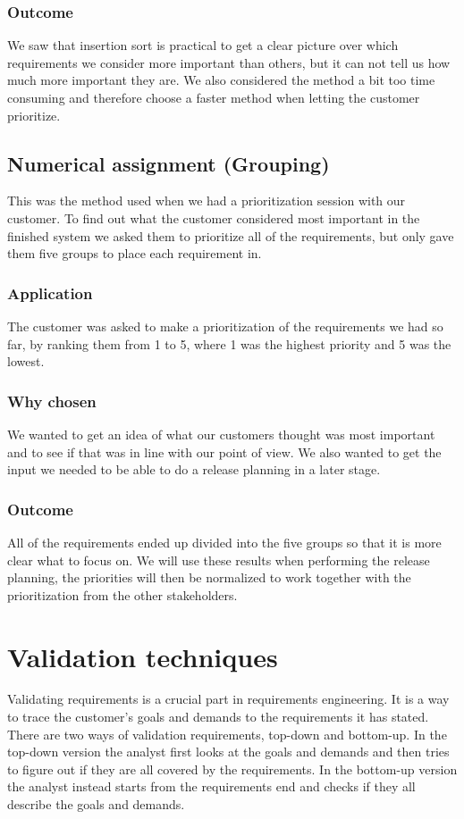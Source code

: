 \documentclass[a4paper]{article}
\begin{document}
		\subsubsection{Outcome}
			We saw that insertion sort is practical to get a clear picture over which requirements we consider more important than others, but it can not tell us how much more important they are. We also considered the method a bit too time consuming and therefore choose a faster method when letting the customer prioritize.  			
		
	\subsection{Numerical assignment (Grouping)}
		This was the method used when we had a prioritization session with our customer.
		To find out what the customer considered most important in the finished system we asked them to prioritize all of the requirements, but only gave them five groups to place each requirement in.
		\subsubsection{Application}
			The customer was asked to make a prioritization of the requirements we had so far, by ranking them from 1 to 5, where 1 was the highest priority and 5 was the lowest.
		\subsubsection{Why chosen}
			We wanted to get an idea of what our customers thought was most important and to see if that was in line with our point of view. We also wanted to get the input we needed to be able to do a release planning in a later stage.
		\subsubsection{Outcome}
			All of the requirements ended up divided into the five groups so that it is more clear what to focus on. We will use these results when performing the release planning, the priorities will then be normalized to work together with the prioritization from the other stakeholders.

	\section{Validation techniques}
	Validating requirements is a crucial part in requirements engineering. It is a way to trace the customer's goals and demands to the requirements it has stated. There are two ways of validation requirements, top-down and bottom-up. In the top-down version the analyst first looks at the goals and demands and then tries to figure out if they are all covered by the requirements. In the bottom-up version the analyst instead starts from the requirements end and checks if they all describe the goals and demands.
						
\end{document}
